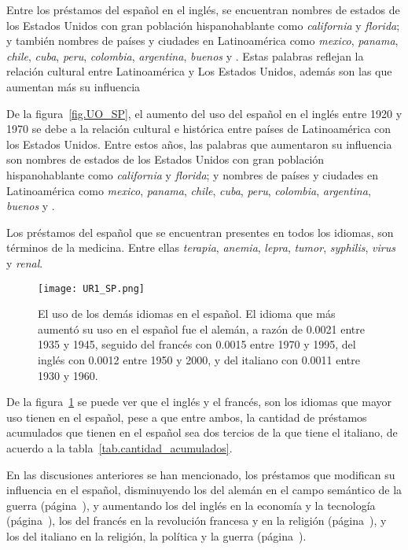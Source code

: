 Entre los préstamos del español en el inglés, se encuentran nombres de 
estados de los Estados Unidos con gran población hispanohablante como \textit{california} y \textit{florida};  y también nombres de países y ciudades en Latinoamérica como \textit{mexico}, \textit{panama}, \textit{chile}, \textit{cuba}, \textit{peru}, \textit{colombia}, \textit{argentina}, \textit{buenos} y . Estas palabras reflejan la relación cultural entre Latinoamérica y Los Estados Unidos, además son las que aumentan más su influencia 


De la figura~\ref{fig.UO_SP}, el aumento del uso del español en el inglés entre 1920 y 1970 se debe a la relación cultural e histórica entre países de Latinoamérica con los Estados Unidos. Entre estos años, las palabras que aumentaron su influencia son  nombres de estados de los Estados Unidos con gran población hispanohablante como \textit{california} y \textit{florida};  y nombres de países y ciudades en Latinoamérica como \textit{mexico}, \textit{panama}, \textit{chile}, \textit{cuba}, \textit{peru}, \textit{colombia}, \textit{argentina}, \textit{buenos} y .

Los préstamos del español que se encuentran presentes en todos los idiomas, son términos de la medicina. Entre ellas \textit{terapia}, \textit{anemia}, \textit{lepra}, \textit{tumor}, \textit{syphilis}, \textit{virus} y \textit{renal}.
 
\label{SP-D}

		
\begin{figure}[h!] %
	\centering
	\texttt{[image: UR1\_SP.png]}
	\caption{El uso de los demás idiomas en el español. El idioma que más aumentó su uso en el español fue el alemán, a razón de 0.0021 entre 1935 y 1945, seguido del francés con 0.0015 entre 1970 y 1995,  del inglés con 0.0012 entre 1950 y 2000, y del italiano con 0.0011 entre 1930 y 1960.}
	\label{fig.UR_SP}
\end{figure}

De la figura~\ref{fig.UR_SP} se puede ver que el inglés y el francés, son los idiomas que mayor uso tienen en el español, pese a que entre ambos, la cantidad de préstamos acumulados que tienen en el español sea dos tercios de la que tiene el italiano, de acuerdo a la tabla~\ref{tab.cantidad_acumulados}.


En las discusiones anteriores se han mencionado,  los préstamos que modifican su influencia en el español, disminuyendo los del alemán  en el campo semántico de la guerra (página~\pageref{GE-D}), y aumentando los del inglés en la economía y la tecnología (página~\pageref{EN-D}),  los del francés en la revolución francesa y en la religión (página~\pageref{FR-D}),  y los del italiano en la religión, la política y la guerra (página~\pageref{IT-D}).
\label{D-SP}




